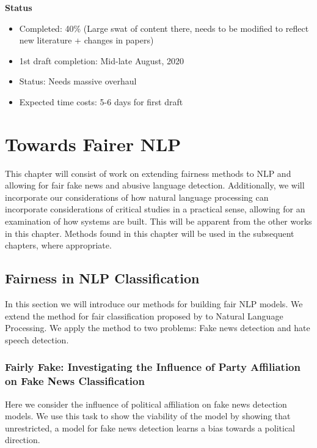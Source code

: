 {\textbf{Status}
\begin{itemize}
    \item Completed: 40\% (Large swat of content there, needs to be modified to reflect new literature + changes in papers)
    \item 1st draft completion: Mid-late August, 2020
    \item Status: Needs massive overhaul
    \item Expected time costs: 5-6 days for first draft
\end{itemize}


\section{Towards Fairer NLP}

This chapter will consist of work on extending fairness methods to NLP and allowing for fair fake news and abusive language detection. Additionally, we will incorporate our considerations of how natural language processing can incorporate considerations of critical studies in a practical sense, allowing for an examination of how systems are built. This will be apparent from the other works in this chapter. Methods found in this chapter will be used in the subsequent chapters, where appropriate.

\subsection{Fairness in NLP Classification}

In this section we will introduce our methods for building fair NLP models. We extend the method for fair classification proposed by \citep{Agarwal:2018} to Natural Language Processing. We apply the method to two problems: Fake news detection and hate speech detection.

\subsubsection{Fairly Fake: Investigating the Influence of Party Affiliation on Fake News Classification}
Here we consider the influence of political affiliation on fake news detection models. We use this task to show the viability of the model by showing that unrestricted, a model for fake news detection learns a bias towards a political direction.

}
